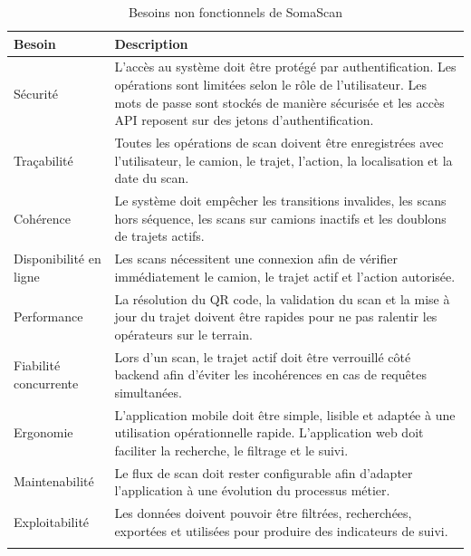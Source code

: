 \begin{longtable}{|p{4cm}|p{10cm}|}
\hline
\textbf{Besoin} & \textbf{Description} \\
\hline
\endhead

Sécurité & L'accès au système doit être protégé par authentification. Les opérations sont limitées selon le rôle de l'utilisateur. Les mots de passe sont stockés de manière sécurisée et les accès API reposent sur des jetons d'authentification. \\
\hline

Traçabilité & Toutes les opérations de scan doivent être enregistrées avec l'utilisateur, le camion, le trajet, l'action, la localisation et la date du scan. \\
\hline

Cohérence & Le système doit empêcher les transitions invalides, les scans hors séquence, les scans sur camions inactifs et les doublons de trajets actifs. \\
\hline

Disponibilité en ligne & Les scans nécessitent une connexion afin de vérifier immédiatement le camion, le trajet actif et l'action autorisée. \\
\hline

Performance & La résolution du QR code, la validation du scan et la mise à jour du trajet doivent être rapides pour ne pas ralentir les opérateurs sur le terrain. \\
\hline

Fiabilité concurrente & Lors d'un scan, le trajet actif doit être verrouillé côté backend afin d'éviter les incohérences en cas de requêtes simultanées. \\
\hline

Ergonomie & L'application mobile doit être simple, lisible et adaptée à une utilisation opérationnelle rapide. L'application web doit faciliter la recherche, le filtrage et le suivi. \\
\hline

Maintenabilité & Le flux de scan doit rester configurable afin d'adapter l'application à une évolution du processus métier. \\
\hline

Exploitabilité & Les données doivent pouvoir être filtrées, recherchées, exportées et utilisées pour produire des indicateurs de suivi. \\
\hline

\caption{Besoins non fonctionnels de SomaScan}
\label{tab:besoins-non-fonctionnels}
\end{longtable}

